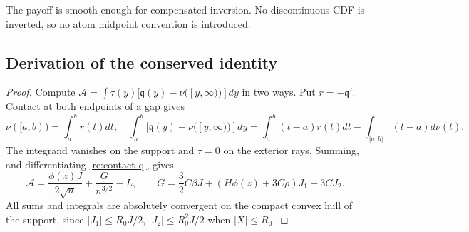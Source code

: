 The payoff is smooth enough for compensated inversion. No discontinuous
CDF is inverted, so no atom midpoint convention is introduced.
\subsection{Derivation of the conserved identity}
\begin{proof}
Compute $\mathcal A=\int\tau(y)[\mathfrak q(y)-\nu([y,\infty))]dy$
in two ways. Put $r=-\mathfrak q'$. Contact at both endpoints of a gap gives
\[
 \nu([a,b))=\int_a^b r(t)dt,
 \quad
 \int_a^b[\mathfrak q(y)-\nu([y,\infty))]dy
 =\int_a^b(t-a)r(t)dt-\int_{[a,b)}(t-a)d\nu(t).
\]
The integrand vanishes on the support and $\tau=0$ on the exterior rays.
Summing, and differentiating \eqref{re:contact-q}, gives
\begin{equation}\label{smooth:A-gap}
 \mathcal A=\frac{\phi(z)J}{2\sqrt n}+\frac{G}{n^{3/2}}-L,
 \qquad
 G=\frac32C\beta J+(H\phi(z)+3C\rho)J_1-3CJ_2.
\end{equation}
All sums and integrals are absolutely convergent on the compact convex
hull of the support, since $|J_1|\le R_0J/2$, $|J_2|\le R_0^2J/2$
when $|X|\le R_0$.


\end{proof}
